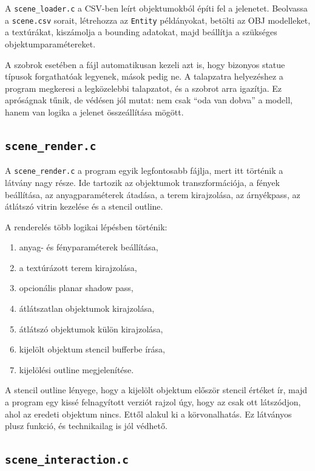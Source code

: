 \documentclass[12pt,a4paper]{article}
\newcommand{\code}[1]{\texttt{#1}}
\begin{document}
A \code{scene\_loader.c} a CSV-ben leírt objektumokból építi fel a jelenetet. Beolvassa a \code{scene.csv} sorait, létrehozza az \code{Entity} példányokat, betölti az OBJ modelleket, a textúrákat, kiszámolja a bounding adatokat, majd beállítja a szükséges objektumparamétereket.

A szobrok esetében a fájl automatikusan kezeli azt is, hogy bizonyos statue típusok forgathatóak legyenek, mások pedig ne. A talapzatra helyezéshez a program megkeresi a legközelebbi talapzatot, és a szobrot arra igazítja. Ez apróságnak tűnik, de védésen jól mutat: nem csak ``oda van dobva'' a modell, hanem van logika a jelenet összeállítása mögött.

\subsection{\code{scene\_render.c}}

A \code{scene\_render.c} a program egyik legfontosabb fájlja, mert itt történik a látvány nagy része. Ide tartozik az objektumok transzformációja, a fények beállítása, az anyagparaméterek átadása, a terem kirajzolása, az árnyékpass, az átlátszó vitrin kezelése és a stencil outline.

A renderelés több logikai lépésben történik:

\begin{enumerate}
    \item anyag- és fényparaméterek beállítása,
    \item a textúrázott terem kirajzolása,
    \item opcionális planar shadow pass,
    \item átlátszatlan objektumok kirajzolása,
    \item átlátszó objektumok külön kirajzolása,
    \item kijelölt objektum stencil bufferbe írása,
    \item kijelölési outline megjelenítése.
\end{enumerate}

A stencil outline lényege, hogy a kijelölt objektum először stencil értéket ír, majd a program egy kissé felnagyított verziót rajzol úgy, hogy az csak ott látszódjon, ahol az eredeti objektum nincs. Ettől alakul ki a körvonalhatás. Ez látványos plusz funkció, és technikailag is jól védhető.

\subsection{\code{scene\_interaction.c}}
\end{document}
